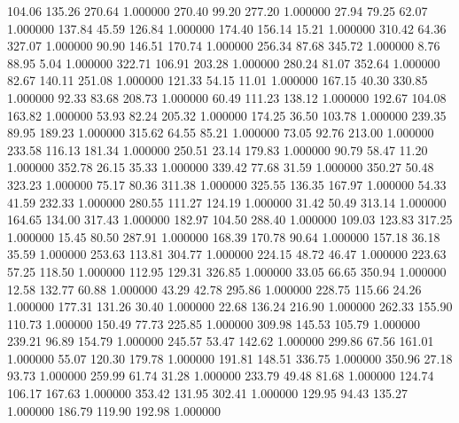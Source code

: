     104.06    135.26    270.64  1.000000
    270.40     99.20    277.20  1.000000
     27.94     79.25     62.07  1.000000
    137.84     45.59    126.84  1.000000
    174.40    156.14     15.21  1.000000
    310.42     64.36    327.07  1.000000
     90.90    146.51    170.74  1.000000
    256.34     87.68    345.72  1.000000
      8.76     88.95      5.04  1.000000
    322.71    106.91    203.28  1.000000
    280.24     81.07    352.64  1.000000
     82.67    140.11    251.08  1.000000
    121.33     54.15     11.01  1.000000
    167.15     40.30    330.85  1.000000
     92.33     83.68    208.73  1.000000
     60.49    111.23    138.12  1.000000
    192.67    104.08    163.82  1.000000
     53.93     82.24    205.32  1.000000
    174.25     36.50    103.78  1.000000
    239.35     89.95    189.23  1.000000
    315.62     64.55     85.21  1.000000
     73.05     92.76    213.00  1.000000
    233.58    116.13    181.34  1.000000
    250.51     23.14    179.83  1.000000
     90.79     58.47     11.20  1.000000
    352.78     26.15     35.33  1.000000
    339.42     77.68     31.59  1.000000
    350.27     50.48    323.23  1.000000
     75.17     80.36    311.38  1.000000
    325.55    136.35    167.97  1.000000
     54.33     41.59    232.33  1.000000
    280.55    111.27    124.19  1.000000
     31.42     50.49    313.14  1.000000
    164.65    134.00    317.43  1.000000
    182.97    104.50    288.40  1.000000
    109.03    123.83    317.25  1.000000
     15.45     80.50    287.91  1.000000
    168.39    170.78     90.64  1.000000
    157.18     36.18     35.59  1.000000
    253.63    113.81    304.77  1.000000
    224.15     48.72     46.47  1.000000
    223.63     57.25    118.50  1.000000
    112.95    129.31    326.85  1.000000
     33.05     66.65    350.94  1.000000
     12.58    132.77     60.88  1.000000
     43.29     42.78    295.86  1.000000
    228.75    115.66     24.26  1.000000
    177.31    131.26     30.40  1.000000
     22.68    136.24    216.90  1.000000
    262.33    155.90    110.73  1.000000
    150.49     77.73    225.85  1.000000
    309.98    145.53    105.79  1.000000
    239.21     96.89    154.79  1.000000
    245.57     53.47    142.62  1.000000
    299.86     67.56    161.01  1.000000
     55.07    120.30    179.78  1.000000
    191.81    148.51    336.75  1.000000
    350.96     27.18     93.73  1.000000
    259.99     61.74     31.28  1.000000
    233.79     49.48     81.68  1.000000
    124.74    106.17    167.63  1.000000
    353.42    131.95    302.41  1.000000
    129.95     94.43    135.27  1.000000
    186.79    119.90    192.98  1.000000
